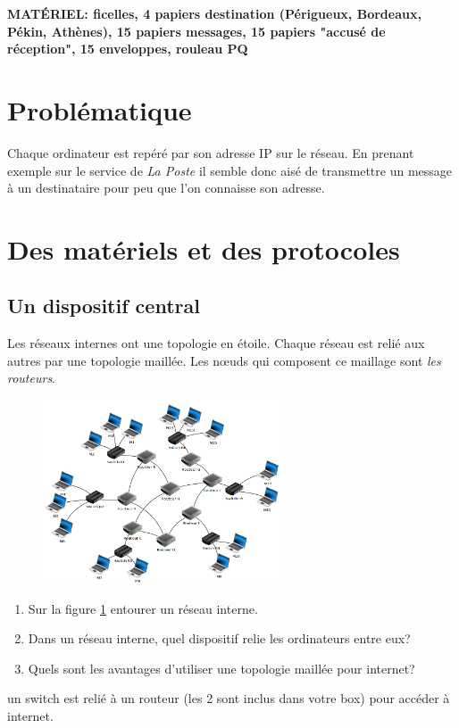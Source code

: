 \documentclass[a4paper,11pt]{article}
\begin{document}
\begin{Form}
\begin{commentprof}
\textbf{MATÉRIEL: ficelles, 4 papiers destination (Périgueux, Bordeaux, Pékin, Athènes), 15 papiers messages, 15 papiers "accusé de réception", 15 enveloppes, rouleau PQ}
\end{commentprof}
\section{Problématique}
Chaque ordinateur est repéré par son adresse IP sur le réseau. En prenant exemple sur le service de \emph{La Poste} il semble donc aisé de transmettre un message à un destinataire pour peu que l'on connaisse son adresse.
\begin{center}
\end{center}
\section{Des matériels et des protocoles}
\subsection{Un dispositif central}
Les réseaux internes ont une topologie en étoile. Chaque réseau est relié aux autres par une topologie maillée. Les nœuds qui composent ce maillage sont \emph{les routeurs}.
\begin{figure}[!h]
\centering
\includegraphics[width=7cm]{ressources/routage.png}
\label{routage}
\end{figure}
\begin{activite}
\begin{enumerate}
\item Sur la figure \ref{routage} entourer un réseau interne.
\item Dans un réseau interne, quel dispositif relie les ordinateurs entre eux?
\item Quels sont les avantages d'utiliser une topologie maillée pour internet?
\end{enumerate}
\end{activite}
\begin{commentprof}
un switch est relié à un routeur (les 2 sont inclus dans votre box) pour accéder à internet.
\end{commentprof}

\end{Form}
\end{document}
